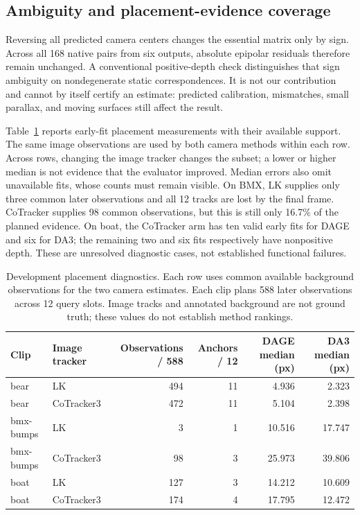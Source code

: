\documentclass[10pt,twocolumn]{article}
\begin{document}
\subsection{Ambiguity and placement-evidence coverage}
Reversing all predicted camera centers changes the essential matrix only by sign. Across all 168 native pairs from six outputs, absolute epipolar residuals therefore remain unchanged. A conventional positive-depth check distinguishes that sign ambiguity on nondegenerate static correspondences. It is not our contribution and cannot by itself certify an estimate: predicted calibration, mismatches, small parallax, and moving surfaces still affect the result.

Table~\ref{tab:anchors} reports early-fit placement measurements with their available support. The same image observations are used by both camera methods within each row. Across rows, changing the image tracker changes the subset; a lower or higher median is not evidence that the evaluator improved. Median errors also omit unavailable fits, whose counts must remain visible. On BMX, LK supplies only three common later observations and all 12 tracks are lost by the final frame. CoTracker supplies 98 common observations, but this is still only 16.7\% of the planned evidence. On boat, the CoTracker arm has ten valid early fits for DAGE and six for DA3; the remaining two and six fits respectively have nonpositive depth. These are unresolved diagnostic cases, not established functional failures.

\begin{table}[t]
\centering
\caption{Development placement diagnostics. Each row uses common available background observations for the two camera estimates. Each clip plans 588 later observations across 12 query slots. Image tracks and annotated background are not ground truth; these values do not establish method rankings.}
\label{tab:anchors}
\begin{tabular}{llrrrr}
\toprule
Clip & Image tracker & Observations / 588 & Anchors / 12 & DAGE median (px) & DA3 median (px)\\
\midrule
bear & LK & 494 & 11 & 4.936 & 2.323\\
bear & CoTracker3 & 472 & 11 & 5.104 & 2.398\\
bmx-bumps & LK & 3 & 1 & 10.516 & 17.747\\
bmx-bumps & CoTracker3 & 98 & 3 & 25.973 & 39.806\\
boat & LK & 127 & 3 & 14.212 & 10.609\\
boat & CoTracker3 & 174 & 4 & 17.795 & 12.472\\
\bottomrule
\end{tabular}
\end{table}
\end{document}
